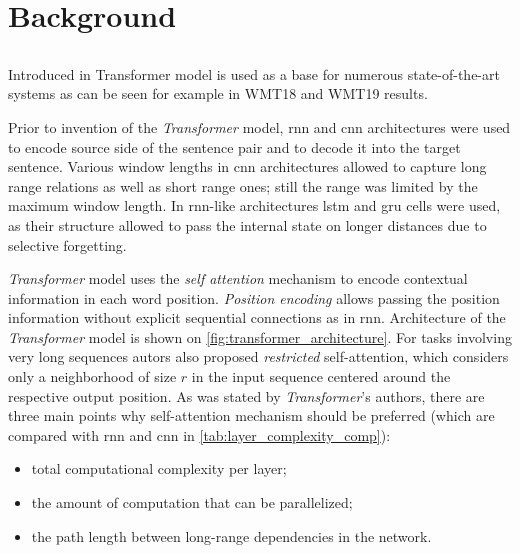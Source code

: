 \chapter{Background}

\section{}


\section{}

Introduced in  Transformer model is used as a base
for numerous state-of-the-art systems as can be seen for example in 
WMT18  and
WMT19  results.

Prior to invention of the \textit{Transformer} model, \acrfull{rnn} and \acrfull{cnn}
architectures were used
to encode source side of the sentence pair and to decode it into the target sentence.
Various window lengths in \acrshort{cnn} architectures allowed to capture
long range relations as well as short range ones;
still the range was limited by the maximum window length.
In \acrshort{rnn}-like architectures \acrfull{lstm} and \acrfull{gru} cells
were used, as their structure allowed to pass the internal state
on longer distances due to selective forgetting.

\textit{Transformer} model uses the \textit{self attention} mechanism
to encode contextual information in each word position.
\textit{Position encoding} allows passing the position
information without explicit sequential connections as in \acrshort{rnn}.
Architecture of the \textit{Transformer} model is shown
on \cref{fig:transformer_architecture}.
For tasks involving very long sequences autors also proposed \textit{restricted}
self-attention, which considers only a neighborhood of size $r$ in the input
sequence centered around the respective output position.
As was stated by \textit{Transformer}'s authors, there are three main points why
self-attention mechanism should be preferred
(which are compared with \acrshort{rnn} and \acrshort{cnn}
in \cref{tab:layer_complexity_comp}):
\begin{itemize}
  \item total computational complexity per layer;
  \item the amount of computation that can be parallelized;
  \item the path length between long-range dependencies in the network.
\end{itemize}

